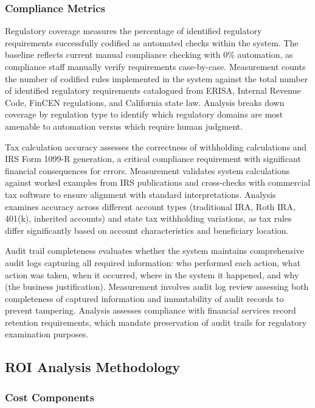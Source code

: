 \subsubsection{Compliance Metrics}

Regulatory coverage measures the percentage of identified regulatory requirements successfully codified as automated checks within the system. The baseline reflects current manual compliance checking with 0\% automation, as compliance staff manually verify requirements case-by-case. Measurement counts the number of codified rules implemented in the system against the total number of identified regulatory requirements catalogued from ERISA, Internal Revenue Code, FinCEN regulations, and California state law. Analysis breaks down coverage by regulation type to identify which regulatory domains are most amenable to automation versus which require human judgment.

Tax calculation accuracy assesses the correctness of withholding calculations and IRS Form 1099-R generation, a critical compliance requirement with significant financial consequences for errors. Measurement validates system calculations against worked examples from IRS publications and cross-checks with commercial tax software to ensure alignment with standard interpretations. Analysis examines accuracy across different account types (traditional IRA, Roth IRA, 401(k), inherited accounts) and state tax withholding variations, as tax rules differ significantly based on account characteristics and beneficiary location.

Audit trail completeness evaluates whether the system maintains comprehensive audit logs capturing all required information: who performed each action, what action was taken, when it occurred, where in the system it happened, and why (the business justification). Measurement involves audit log review assessing both completeness of captured information and immutability of audit records to prevent tampering. Analysis assesses compliance with financial services record retention requirements, which mandate preservation of audit trails for regulatory examination purposes.

\subsection{ROI Analysis Methodology}

\subsubsection{Cost Components}

